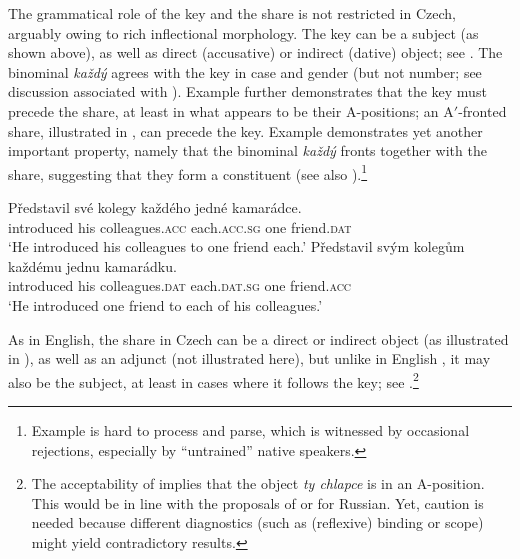 \documentclass[output=paper,colorlinks,citecolor=brown,newtxmath]{langscibook}
\begin{document}
\noindent The grammatical role of the key and the share is not restricted in Czech, arguably owing to rich inflectional morphology. The key can be a subject (as shown above), as well as direct (accusative) or indirect (dative) object; see . The binominal \textit{každý} agrees with the key in case and gender (but not number; see discussion associated with ). Example  further demonstrates that the key must precede the share, at least in what appears to be their A-positions; an A$'$-fronted share, illustrated in , can precede the key. Example  demonstrates yet another important property, namely that the binominal \textit{každý} fronts together with the share, suggesting that they form a constituent (see also \citealt[437]{Safir1988}).\footnote{Example  is hard to process and parse, which is witnessed by occasional rejections, especially by “untrained'' native speakers.}

\ea\label{ex:key-role}\ea\gll Představil své kolegy každého jedné kamarádce.\\
introduced his colleagues.\textsc{acc} each.\textsc{acc.sg} one friend.\textsc{dat}\\
\glt `He introduced his colleagues to one friend each.'
\ex\gll Představil svým kolegům každému jednu kamarádku.\\
introduced his colleagues.\textsc{dat} each.\textsc{dat.sg} one friend.\textsc{acc}\\
\glt `He introduced one friend to each of his colleagues.'
\z\z

\ea\label{ex:key-order}
\z\z

\noindent As in English, the share in Czech can be a direct or indirect object (as illustrated in ), as well as an adjunct (not illustrated here), but unlike in English \citep[436]{Safir1988}, it may also be the subject, at least in cases where it follows the key; see .\footnote{The acceptability of  implies that the object \textit{ty chlapce} is in an A-position. This would be in line with the proposals of \citet{Bailyn2004} or \citet{Titov2018} for Russian. Yet, caution is needed because different diagnostics (such as (reflexive) binding or scope) might yield contradictory results.}
\end{document}
